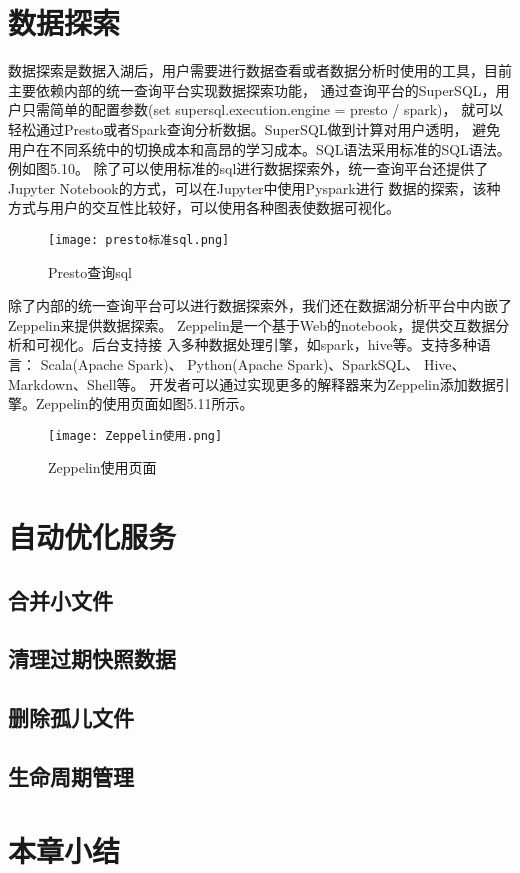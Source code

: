 \section{数据探索}

数据探索是数据入湖后，用户需要进行数据查看或者数据分析时使用的工具，目前主要依赖内部的统一查询平台实现数据探索功能，
通过查询平台的SuperSQL，用户只需简单的配置参数(set supersql.execution.engine = presto / spark)，
就可以轻松通过Presto或者Spark查询分析数据。SuperSQL做到计算对用户透明，
避免用户在不同系统中的切换成本和高昂的学习成本。SQL语法采用标准的SQL语法。例如图5.10。
除了可以使用标准的sql进行数据探索外，统一查询平台还提供了Jupyter Notebook的方式，可以在Jupyter中使用Pyspark进行
数据的探索，该种方式与用户的交互性比较好，可以使用各种图表使数据可视化。

\begin{figure}[h]
  \centering
  \texttt{[image: presto标准sql.png]}
  \caption{Presto查询sql}
  \label{fig:badge}
\end{figure}

除了内部的统一查询平台可以进行数据探索外，我们还在数据湖分析平台中内嵌了Zeppelin来提供数据探索。
Zeppelin是一个基于Web的notebook，提供交互数据分析和可视化。后台支持接
入多种数据处理引擎，如spark，hive等。支持多种语言： Scala(Apache Spark)、
Python(Apache Spark)、SparkSQL、 Hive、 Markdown、Shell等。
开发者可以通过实现更多的解释器来为Zeppelin添加数据引擎。Zeppelin的使用页面如图5.11所示。

\begin{figure}[h]
  \centering
  \texttt{[image: Zeppelin使用.png]}
  \caption{Zeppelin使用页面}
  \label{fig:badge}
\end{figure}

\section{自动优化服务}



\subsection{合并小文件}



\subsection{清理过期快照数据}



\subsection{删除孤儿文件}



\subsection{生命周期管理}



\section{本章小结}


